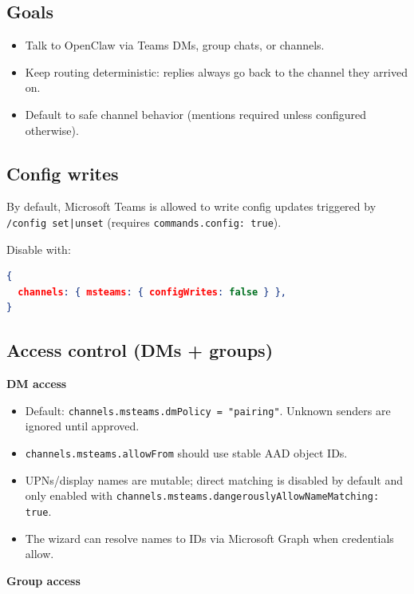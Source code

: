 \subsection{Goals}


\begin{itemize}
  \item Talk to OpenClaw via Teams DMs, group chats, or channels.
  \item Keep routing deterministic: replies always go back to the channel they arrived on.
  \item Default to safe channel behavior (mentions required unless configured otherwise).
\end{itemize}


\subsection{Config writes}


By default, Microsoft Teams is allowed to write config updates triggered by \texttt{/config set|unset} (requires \texttt{commands.config: true}).

Disable with:

\begin{lstlisting}[language=json]
{
  channels: { msteams: { configWrites: false } },
}
\end{lstlisting}


\subsection{Access control (DMs + groups)}


\textbf{DM access}

\begin{itemize}
  \item Default: \texttt{channels.msteams.dmPolicy = "pairing"}. Unknown senders are ignored until approved.
  \item \texttt{channels.msteams.allowFrom} should use stable AAD object IDs.
  \item UPNs/display names are mutable; direct matching is disabled by default and only enabled with \texttt{channels.msteams.dangerouslyAllowNameMatching: true}.
  \item The wizard can resolve names to IDs via Microsoft Graph when credentials allow.
\end{itemize}


\textbf{Group access}

